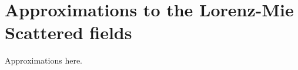\SkipTocEntry\chapter{Approximations to the Lorenz-Mie Scattered fields} 
\label{app:lorenzmie_approx}

Approximations here.
